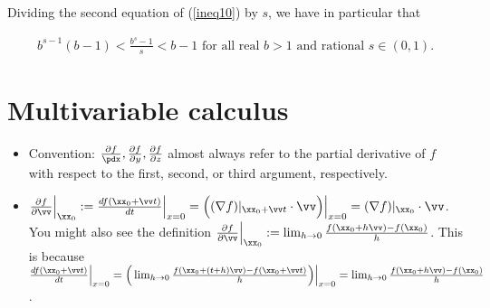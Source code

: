 \documentclass{article}
\begin{document}
Dividing the second equation of (\ref{ineq10}) by $s$, we have in particular that

\begin{align}
    \label{ineq11}
     b^{s - 1}(b - 1) < \frac{b^s - 1}{s} < b - 1 \text{ for all real $b > 1$ and rational $s \in (0, 1)$}.
\end{align}

\part*{Multivariable calculus}

\begin{itemize}
    \item Convention: $\frac{\pd f}{\pdx}, \frac{\pd f}{\pd y}, \frac{\pd f}{\pd z}$ almost always refer to the partial derivative of $f$ with respect to the first, second, or third argument, respectively.
    \item $\frac{\pd f}{\pd \vv}\Big|_{\xx_0} := \frac{df(\xx_0 + \vv t)}{dt}\Big|_{x = 0} = \Big( (\nabla f)|_{\xx_0 + \vv t} \cdot \vv \Big)\Big|_{x = 0} = (\nabla f) |_{\xx_0} \cdot \vv$. You might also see the definition $\frac{\pd f}{\pd \vv}\Big|_{\xx_0} := \lim_{h \rightarrow 0}\frac{f(\xx_0 + h \vv) - f(\xx_0)}{h}$. This is because $\frac{df(\xx_0 + \vv t)}{dt}\Big|_{x = 0} = \Big(\lim_{h \rightarrow 0} \frac{f(\xx_0 + (t + h) \vv) - f(\xx_0 + \vv t)}{h}\Big)\Big|_{x = 0} = \lim_{h \rightarrow 0}\frac{f(\xx_0 + h \vv) - f(\xx_0)}{h}$.
\end{itemize}
\end{document}
